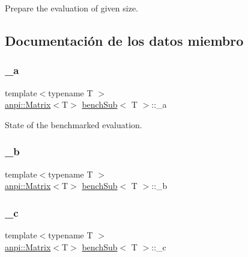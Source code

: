 Prepare the evaluation of given size. 



\subsection{Documentación de los datos miembro}
\mbox{\label{classbenchSub_af02506fae40f68caa638a39204021a0b}} 
\subsubsection{\texorpdfstring{\+\_\+a}{\_a}}
{\footnotesize\ttfamily template$<$typename T $>$ \\
\hyperlink{classanpi_1_1Matrix}{anpi\+::\+Matrix}$<$T$>$ \hyperlink{classbenchSub}{bench\+Sub}$<$ T $>$\+::\+\_\+a\hspace{0.3cm}{\ttfamily [protected]}}



State of the benchmarked evaluation. 

\mbox{\label{classbenchSub_a9bf77fe2081cf478d58358632e719c1e}} 
\subsubsection{\texorpdfstring{\+\_\+b}{\_b}}
{\footnotesize\ttfamily template$<$typename T $>$ \\
\hyperlink{classanpi_1_1Matrix}{anpi\+::\+Matrix}$<$T$>$ \hyperlink{classbenchSub}{bench\+Sub}$<$ T $>$\+::\+\_\+b\hspace{0.3cm}{\ttfamily [protected]}}

\mbox{\label{classbenchSub_aff8c800d696bc6aeb44259f43fa4457c}} 
\subsubsection{\texorpdfstring{\+\_\+c}{\_c}}
{\footnotesize\ttfamily template$<$typename T $>$ \\
\hyperlink{classanpi_1_1Matrix}{anpi\+::\+Matrix}$<$T$>$ \hyperlink{classbenchSub}{bench\+Sub}$<$ T $>$\+::\+\_\+c\hspace{0.3cm}{\ttfamily [protected]}}

